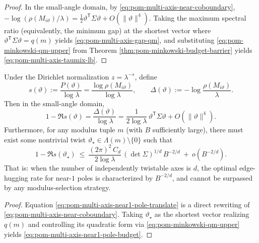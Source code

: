 \begin{proof}
In the small-angle domain, by \eqref{eq:pom-multi-axis-near-coboundary},
\(
-\log(\rho(M_{i\vartheta})/\lambda)=\frac12\vartheta^{\mathsf T}\Sigma\vartheta+O(\|\vartheta\|^4)
\).
Taking the maximum spectral ratio (equivalently, the minimum gap) at the shortest vector where \(\vartheta^{\mathsf T}\Sigma\vartheta=q(m)\) yields \eqref{eq:pom-multi-axis-gap-qm}, and substituting \eqref{eq:pom-minkowski-qm-upper} from Theorem \ref{thm:pom-minkowski-budget-barrier} yields \eqref{eq:pom-multi-axis-taumix-lb}.
\end{proof}

\begin{corollary}\label{cor:pom-multi-axis-near1-pole-barrier}
Under the Dirichlet normalization \(z=\lambda^{-s}\), define
\[
s(\vartheta):=\frac{P(\vartheta)}{\log\lambda}
=\frac{\log\rho(M_{i\vartheta})}{\log\lambda},
\qquad
\Delta(\vartheta):=-\log\frac{\rho(M_{i\vartheta})}{\lambda}.
\]
Then in the small-angle domain,
\begin{equation}\label{eq:pom-multi-axis-near1-pole-translate}
1-\Re s(\vartheta)=\frac{\Delta(\vartheta)}{\log\lambda}
=\frac{1}{2\log\lambda}\,\vartheta^{\mathsf T}\Sigma\vartheta+O(\|\vartheta\|^4).
\end{equation}
Furthermore, for any modulus tuple \(m\) (with \(B\) sufficiently large), there must exist some nontrivial twist \(\vartheta_\star\in \Lambda(m)\setminus\{0\}\) such that
\begin{equation}\label{eq:pom-multi-axis-near1-pole-budget}
1-\Re s(\vartheta_\star)
\ \le\
\frac{(2\pi)^2\,C_d}{2\log\lambda}\,(\det\Sigma)^{1/d}\,B^{-2/d}\ +\ o(B^{-2/d}).
\end{equation}
That is: when the number of independently twistable axes is \(d\), the optimal edge-hugging rate for near-\(1\) poles is characterized by \(B^{-2/d}\), and cannot be surpassed by any modulus-selection strategy.
\end{corollary}

\begin{proof}
Equation \eqref{eq:pom-multi-axis-near1-pole-translate} is a direct rewriting of \eqref{eq:pom-multi-axis-near-coboundary}.
Taking \(\vartheta_\star\) as the shortest vector realizing \(q(m)\) and controlling its quadratic form via \eqref{eq:pom-minkowski-qm-upper} yields \eqref{eq:pom-multi-axis-near1-pole-budget}.
\end{proof}

